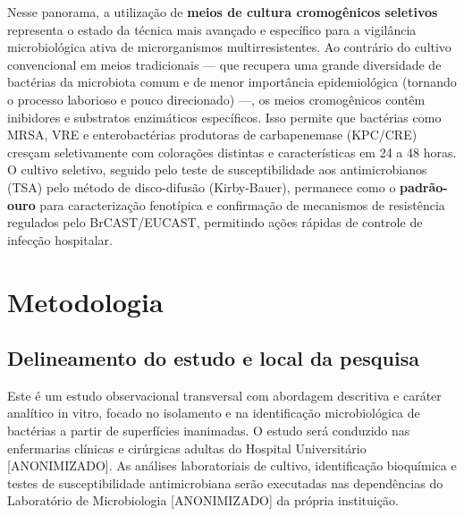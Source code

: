 \documentclass[12pt,a4paper]{article}
\begin{document}
Nesse panorama, a utilização de \textbf{meios de cultura cromogênicos seletivos} representa o estado da técnica mais avançado e específico para a vigilância microbiológica ativa de microrganismos multirresistentes. Ao contrário do cultivo convencional em meios tradicionais --- que recupera uma grande diversidade de bactérias da microbiota comum e de menor importância epidemiológica (tornando o processo laborioso e pouco direcionado) ---, os meios cromogênicos contêm inibidores e substratos enzimáticos específicos. Isso permite que bactérias como MRSA, VRE e enterobactérias produtoras de carbapenemase (KPC/CRE) cresçam seletivamente com colorações distintas e características em 24 a 48 horas. O cultivo seletivo, seguido pelo teste de susceptibilidade aos antimicrobianos (TSA) pelo método de disco-difusão (Kirby-Bauer), permanece como o \textbf{padrão-ouro} para caracterização fenotípica e confirmação de mecanismos de resistência regulados pelo BrCAST/EUCAST, permitindo ações rápidas de controle de infecção hospitalar.
\newpage

\section{Metodologia}

\subsection{Delineamento do estudo e local da pesquisa}
Este é um estudo observacional transversal com abordagem descritiva e caráter analítico in vitro, focado no isolamento e na identificação microbiológica de bactérias a partir de superfícies inanimadas. O estudo será conduzido nas enfermarias clínicas e cirúrgicas adultas do Hospital Universitário [ANONIMIZADO]. As análises laboratoriais de cultivo, identificação bioquímica e testes de susceptibilidade antimicrobiana serão executadas nas dependências do Laboratório de Microbiologia [ANONIMIZADO] da própria instituição.
\end{document}
